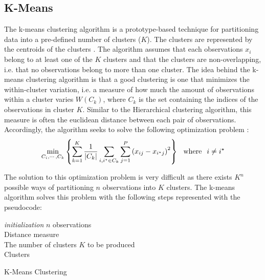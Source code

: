 \documentclass[../thesis.tex]{subfiles}
\begin{document}
\vspace*{-0,25cm}\subsection{K-Means}
\label{subsec:K-Means}

\noindent The k-means clustering algorithm \citep{forgy1965cluster} is a prototype-based technique for partitioning data into a pre-defined number of clusters ($K$). The clusters are represented by the centroids of the clusters \citep{tan2007introduction}. The algorithm assumes that each observations $x_i$ belong to at least one of the $K$ clusters and that the clusters are non-overlapping, i.e. that no observations belong to more than one cluster. The idea behind the k-means clustering algorithm is that a good clustering is one that minimizes the within-cluster variation, i.e. a measure of how much the amount of observations within a cluster varies $W(C_k)$, where $C_k$ is the set containing the indices of the observations in cluster $K$. Similar to the Hierarchical clustering algorithm, this measure is often the euclidean distance between each pair of observations. Accordingly, the algorithm seeks to solve the following optimization problem \citep{james2013introduction}:
\begin{align}
    \min_{C_i, \cdots, C_k} \left\{\sum_{k=1}^K \frac{1}{|C_k|} \sum_{i,i^\star \in C_k}\sum_{j=1}^P\left(x_{ij} - x_{i^\star j} \right)^2 \right\}\hspace*{0,25cm}\text{where}\hspace*{0,25cm} i \neq i^\star
\end{align}

\noindent The solution to this optimization problem is very difficult as there exists $K^n$ possible ways of partitioning $n$ observations into $K$ clusters. The k-means algorithm solves this problem with the following steps represented with the pseudocode:\\

\begin{algorithm}[H]{
\SetAlgoLined
\textit{initialization}\;
    \hspace*{0,5cm}$n$ observations\\
    \hspace*{0,5cm}Distance measure\\
    \hspace*{0,5cm}The number of clusters $K$ to be produced\\
    \Return Clusters
}
\caption{K-Means Clustering}
\end{algorithm}
\end{document}
